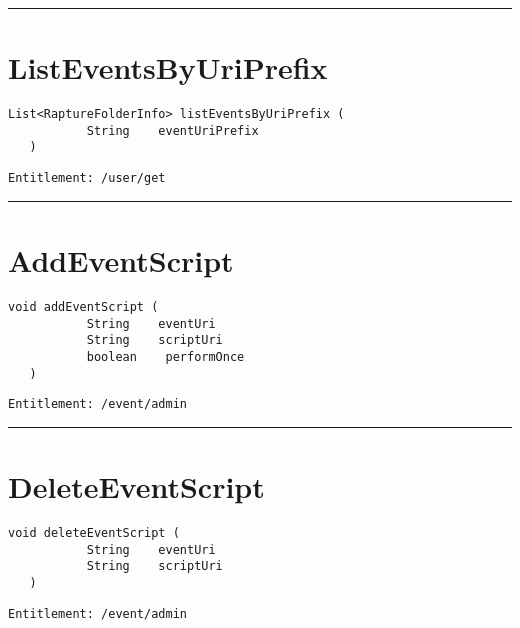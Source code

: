 \rule{12cm}{2pt}
\section{ListEventsByUriPrefix}
\label{Api:ListEventsByUriPrefix}
\begin{lstlisting}[style=nonumbers]
   List<RaptureFolderInfo> listEventsByUriPrefix (
           String    eventUriPrefix
   )
\end{lstlisting}
\begin{Verbatim}[formatcom=\color{Maroon}]
  Entitlement: /user/get
\end{Verbatim}



\rule{12cm}{2pt}
\section{AddEventScript}
\label{Api:AddEventScript}
\begin{lstlisting}[style=nonumbers]
   void addEventScript (
           String    eventUri
           String    scriptUri
           boolean    performOnce
   )
\end{lstlisting}
\begin{Verbatim}[formatcom=\color{Maroon}]
  Entitlement: /event/admin
\end{Verbatim}



\rule{12cm}{2pt}
\section{DeleteEventScript}
\label{Api:DeleteEventScript}
\begin{lstlisting}[style=nonumbers]
   void deleteEventScript (
           String    eventUri
           String    scriptUri
   )
\end{lstlisting}
\begin{Verbatim}[formatcom=\color{Maroon}]
  Entitlement: /event/admin
\end{Verbatim}



